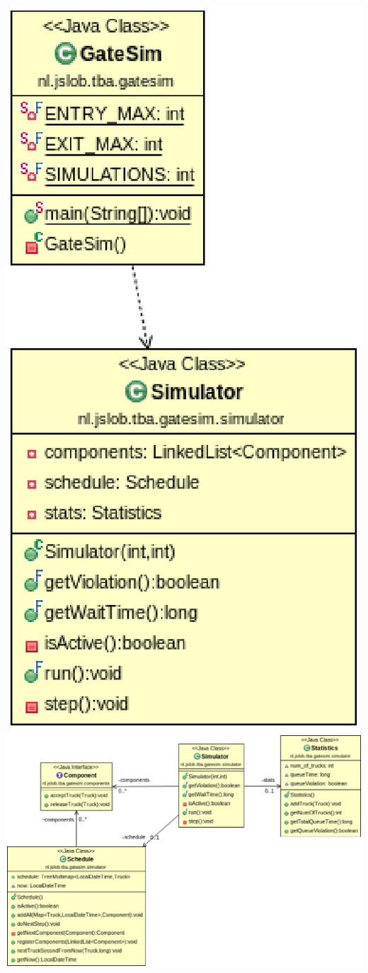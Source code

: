 \documentclass{article}
\begin{document}
\includegraphics[scale=0.5]{GateSim.eps}
\includegraphics[scale=0.5]{Simulator.eps}
\end{document}
